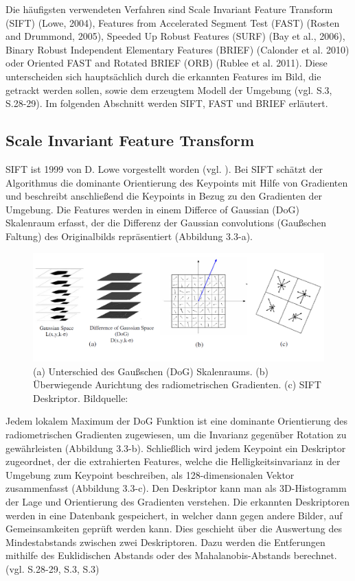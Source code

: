 Die häufigsten verwendeten Verfahren sind \glqq Scale Invariant Feature Transform\grqq{} (SIFT) (Lowe, 2004), \glqq Features from Accelerated Segment Test\grqq{} (FAST) (Rosten and Drummond, 2005), \glqq Speeded Up Robust Features\grqq{} (SURF) (Bay et al., 2006), \glqq Binary Robust Independent Elementary Features\grqq{} (BRIEF) (Calonder et al. 2010) oder \glqq Oriented FAST and Rotated BRIEF\grqq{} (ORB) (Rublee et al. 2011). Diese unterscheiden sich hauptsächlich durch die erkannten Features im Bild, die getrackt werden sollen, sowie dem erzeugtem Modell der Umgebung (vgl. \cite{robust_feature} S.3, \cite{natural_feature} S.28-29). Im folgenden Abschnitt werden SIFT, FAST und BRIEF erläutert.

\subsection{Scale Invariant Feature Transform} 
SIFT ist 1999 von D. Lowe vorgestellt worden (vgl. \cite{sift}). Bei SIFT schätzt der Algorithmus die dominante Orientierung des Keypoints mit Hilfe von Gradienten und beschreibt anschließend die Keypoints in Bezug zu den Gradienten der Umgebung. Die Features werden in einem \glqq Differce of Gaussian\grqq{} (DoG) Skalenraum erfasst,  der die Differenz der \glqq Gaussian convolutions\grqq{} (Gaußschen Faltung) des Originalbilds repräsentiert (Abbildung 3.3-a).

\begin{figure}[H]
	\centering
	\includegraphics[scale=0.5]{sift.png}
	\caption{(a) Unterschied des Gaußschen (DoG) Skalenraums. (b) Überwiegende Aurichtung des radiometrischen Gradienten. (c) SIFT Deskriptor. Bildquelle: \cite{old_new_feature}}
\end{figure}

Jedem lokalem Maximum der DoG Funktion ist eine dominante Orientierung des radiometrischen Gradienten zugewiesen, um die Invarianz gegenüber Rotation zu gewährleisten (Abbildung 3.3-b).
Schließlich wird jedem Keypoint ein Deskriptor zugeordnet, der die extrahierten Features, welche die Helligkeitsinvarianz in der Umgebung zum Keypoint beschreiben, als 128-dimensionalen Vektor zusammenfasst (Abbildung 3.3-c). Den Deskriptor kann man als 3D-Histogramm der Lage und Orientierung des Gradienten verstehen. Die erkannten Deskriptoren werden in eine Datenbank gespeichert, in welcher dann gegen andere Bilder, auf Gemeinsamkeiten geprüft werden kann. Dies geschieht über die Auswertung des Mindestabstands zwischen zwei Deskriptoren. Dazu werden die Entferungen mithilfe des  Euklidischen Abstands oder des Mahalanobis-Abstands berechnet.  (vgl. \cite{natural_feature} S.28-29, \cite{det_des} S.3, \cite{old_new_feature} S.3) 

